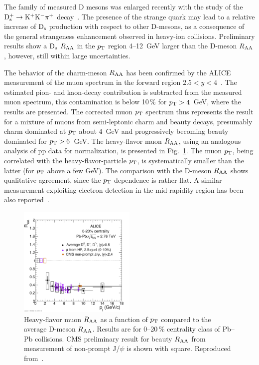 The family of measured D mesons was enlarged recently with the study of the ${\rm D}_{\rm s}^+ \rightarrow {\rm K}^+{\rm K}^-\pi^+$ decay~\cite{Abelev:2012tca}. The presence of the strange quark may lead to a relative increase of ${\rm D}_{\rm s}$ production with respect to other D-mesons, as a consequence of the general strangeness enhancement observed in heavy-ion collisions. Preliminary results show a ${\rm D}_{\rm s}$ $R_{\rm AA}$ in the $p_{\rm T}$ region 4--12~GeV larger than the D-meson $R_{\rm AA}$, however, still within large uncertainties.

The behavior of the charm-meson $R_{\rm AA}$ has been confirmed by the ALICE measurement of the muon spectrum in the forward region $2.5 < y < 4$~\cite{Abelev:2012qh}. The estimated pion- and kaon-decay contribution is subtracted from the measured muon spectrum, this contamination is below 10\,\% for $p_{\rm T} > 4$~GeV, where the results are presented. The corrected muon $p_{\rm T}$ spectrum thus represents the result for a mixture of muons from semi-leptonic charm and beauty decays, presumably charm dominated at $p_{\rm T}$ about 4~GeV and progressively becoming beauty dominated for $p_{\rm T} > 6$~GeV. The heavy-flavor muon $R_{\rm AA}$, using an analogous analysis of pp data for normalization, is presented in Fig.~\ref{figks:HFmuonRAA}. The muon $p_{\rm T}$, being correlated with the heavy-flavor-particle $p_{\rm T}$, is systematically smaller than the latter (for $p_{\rm T}$ above a few GeV). The comparison with the D-meson $R_{\rm AA}$ shows qualitative agreement, since the $p_{\rm T}$ dependence is rather flat. A similar measurement exploiting electron detection in the mid-rapidity region has been also reported~\cite{Abelev:2012xe}.

\begin{figure}
\centering
\includegraphics[width=0.5\textwidth]{heavyflavorfigs/DmesonHFmuonBRAA.pdf}
\caption{Heavy-flavor muon $R_{\rm AA}$ as a function of $p_{\rm T}$ compared to the average D-meson $R_{\rm AA}$. Results are for 0--20\,\% centrality class of Pb--Pb collisions. CMS preliminary result for beauty $R_{\rm AA}$ from measurement of non-prompt J/$\psi$ is shown with square. Reproduced from~\cite{Abelev:2012qh}.}
\label{figks:HFmuonRAA}
\end{figure}

